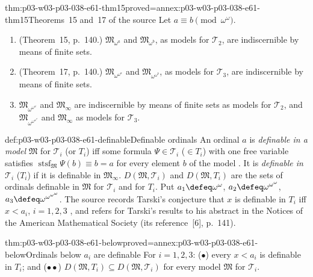 \begin{hbtheorem}{thm:p03-w03-p03-038-e61-thm15}{proved=annex:p03-w03-p03-038-e61-thm15}{Theorems~15 and~17 of the source}
Let \(a\equiv b\pmod{\omega^\omega}\).
\begin{enumerate}
\item (Theorem~15, p.~140.) \(\mathfrak M_{\omega^a}\) and
      \(\mathfrak M_{\omega^b}\), as models for \(\mathcal T_2\), are
      indiscernible by means of finite sets.
\item (Theorem~17, p.~140.) \(\mathfrak M_{\omega^{\omega^a}}\) and
      \(\mathfrak M_{\omega^{\omega^b}}\), as models for \(\mathcal T_3\),
      are indiscernible by means of finite sets.
\item \(\mathfrak M_{\omega^{\omega^\omega}}\) and \(\mathfrak M_\infty\)
      are indiscernible by means of finite sets as models for
      \(\mathcal T_2\), and
      \(\mathfrak M_{\omega^{\omega^{\omega^\omega}}}\) and
      \(\mathfrak M_\infty\) as models for \(\mathcal T_3\).
\end{enumerate}
\end{hbtheorem}

\begin{hbdefinition}{def:p03-w03-p03-038-e61-definable}{Definable ordinals}
An ordinal \(a\) is \emph{definable in a model} \(\mathfrak M\) for
\(\mathcal T_i\) (or \(T_i\)) iff some formula \(\Psi\in\mathcal T_i\)
(\(\in T_i\)) with one free variable satisfies
\(\operatorname{stsf}_{\mathfrak M}\Psi(b)\equiv b=a\) for every element
\(b\) of the model \cite[p.~140]{Ehrenfeucht1961}. It is \emph{definable
in} \(\mathcal T_i\) (\(T_i\)) if it is definable in
\(\mathfrak M_\infty\). \(D(\mathfrak M,\mathcal T_i)\) and
\(D(\mathfrak M,T_i)\) are the sets of ordinals definable in
\(\mathfrak M\) for \(\mathcal T_i\) and for \(T_i\). Put
\(a_1\defeq\omega^\omega\), \(a_2\defeq\omega^{\omega^\omega}\),
\(a_3\defeq\omega^{\omega^{\omega^\omega}}\). The source records
Tarski's conjecture that \(x\) is definable in \(T_i\) iff \(x<a_i\),
\(i=1,2,3\) \cite[p.~140]{Ehrenfeucht1961}, and refers for Tarski's
results to his abstract in the Notices of the American Mathematical
Society (its reference~[6], p.~141).
\end{hbdefinition}

\begin{hbtheorem}{thm:p03-w03-p03-038-e61-below}{proved=annex:p03-w03-p03-038-e61-below}{Ordinals below \(a_i\) are definable}
For \(i=1,2,3\): (\(\bullet\)) every \(x<a_i\) is definable in \(T_i\);
and (\(\bullet\bullet\)) \(D(\mathfrak M,T_i)\subseteq
D(\mathfrak M,\mathcal T_i)\) for every model \(\mathfrak M\) for
\(\mathcal T_i\).
\end{hbtheorem}

